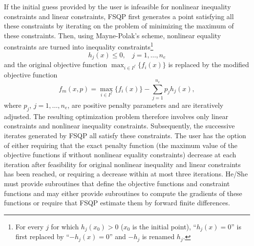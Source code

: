 If the initial guess provided by the user is infeasible for nonlinear 
inequality constraints and linear constraints, FSQP first 
generates a point satisfying all these constraints
by iterating on the problem of minimizing
the maximum of these constraints. Then, 
using Mayne-Polak's scheme\Lspace {}\Rcitemark \Rspace{},
nonlinear equality constraints are turned into 
inequality constraints\footnote{For every $j$ for which $h_j(x_0)>0$
($x_0$ is the initial point), ``$h_j(x)=0$'' is first replaced by 
``$-h_j(x)=0$'' and $-h_j$ is renamed $h_j$.}
$$h_j(x)\leq 0,~~~~j=1,\ldots,n_e$$
and the original objective function $\max_{i\in I^f}\{f_i(x)\}$ 
is replaced by the modified objective function
$$f_m(x,p)=\max\limits_{i\in I^f}\{f_i(x)\}-\sum_{j=1}^{n_e}p_jh_j(x),$$
where $p_j$, $j=1,\ldots,n_e$, are positive penalty parameters
and are iteratively adjusted.
The resulting optimization problem therefore involves only 
linear constraints and nonlinear inequality constraints.
Subsequently, the successive iterates generated by
FSQP all satisfy these constraints. The user has the option of 
either requiring that the exact penalty function 
(the maximum value of the objective functions if without nonlinear equality
constraints) decrease at each iteration after feasibility for
original nonlinear inequality and linear constraints has been reached,
or requiring a decrease within at most three iterations.
He/She must provide subroutines that define the objective functions
and constraint functions and may either provide subroutines
to compute the gradients of these functions or require that FSQP
estimate them by forward finite differences.

